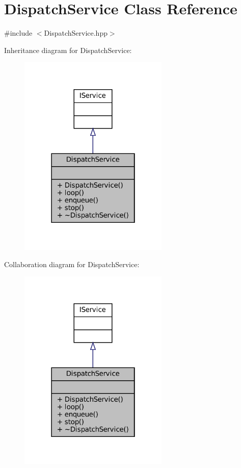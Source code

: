 \hypertarget{classDispatchService}{}\section{Dispatch\+Service Class Reference}
\label{classDispatchService}


{\ttfamily \#include $<$Dispatch\+Service.\+hpp$>$}



Inheritance diagram for Dispatch\+Service\+:
\nopagebreak
\begin{figure}[H]
\begin{center}
\leavevmode
\includegraphics[width=202pt]{classDispatchService__inherit__graph}
\end{center}
\end{figure}


Collaboration diagram for Dispatch\+Service\+:
\nopagebreak
\begin{figure}[H]
\begin{center}
\leavevmode
\includegraphics[width=202pt]{classDispatchService__coll__graph}
\end{center}
\end{figure}
